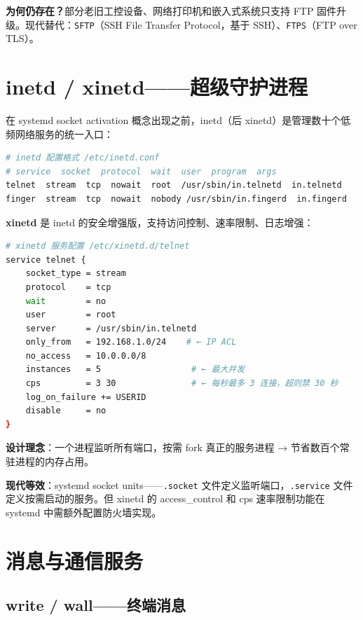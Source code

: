 \documentclass[12pt,UTF8]{ctexbook}
\begin{document}
\textbf{为何仍存在？}部分老旧工控设备、网络打印机和嵌入式系统只支持 FTP 固件升级。现代替代：\texttt{SFTP}（SSH File Transfer Protocol，基于 SSH）、\texttt{FTPS}（FTP over TLS）。

\section{inetd / xinetd——超级守护进程}
\label{sec:inetd}

在 systemd socket activation 概念出现之前，inetd（后 xinetd）是管理数十个低频网络服务的统一入口：

\begin{lstlisting}[language=bash]
# inetd 配置格式 /etc/inetd.conf
# service  socket  protocol  wait  user  program  args
telnet  stream  tcp  nowait  root  /usr/sbin/in.telnetd  in.telnetd
finger  stream  tcp  nowait  nobody /usr/sbin/in.fingerd  in.fingerd
\end{lstlisting}

\textbf{xinetd} 是 inetd 的安全增强版，支持访问控制、速率限制、日志增强：

\begin{lstlisting}[language=bash]
# xinetd 服务配置 /etc/xinetd.d/telnet
service telnet {
    socket_type = stream
    protocol    = tcp
    wait        = no
    user        = root
    server      = /usr/sbin/in.telnetd
    only_from   = 192.168.1.0/24    # ← IP ACL
    no_access   = 10.0.0.0/8
    instances   = 5                  # ← 最大并发
    cps         = 3 30               # ← 每秒最多 3 连接，超则禁 30 秒
    log_on_failure += USERID
    disable     = no
}
\end{lstlisting}

\textbf{设计理念}：一个进程监听所有端口，按需 fork 真正的服务进程 → 节省数百个常驻进程的内存占用。

\textbf{现代等效}：systemd socket units——\texttt{.socket} 文件定义监听端口，\texttt{.service} 文件定义按需启动的服务。但 xinetd 的 access\_control 和 cps 速率限制功能在 systemd 中需额外配置防火墙实现。

\section{消息与通信服务}
\label{sec:messaging}

\subsection{write / wall——终端消息}
\end{document}
